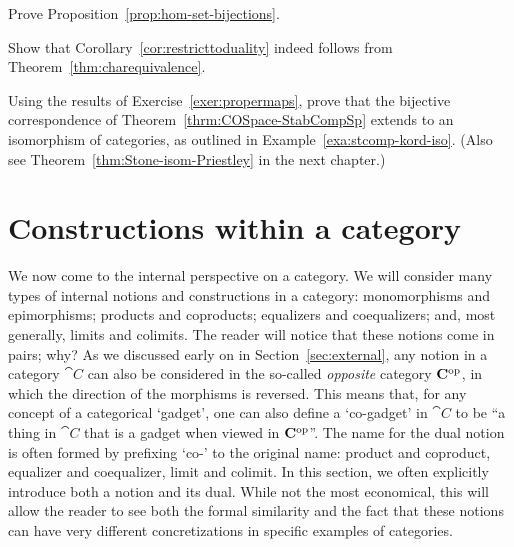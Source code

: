 \begin{exercise}\label{exe:proof-of-adjunction-equiv-def}
  Prove Proposition~\ref{prop:hom-set-bijections}.
\end{exercise}

\begin{exercise}\label{exe:proofofrestricttoduality}
Show that Corollary~\ref{cor:restricttoduality} indeed follows from Theorem~\ref{thm:charequivalence}.
\end{exercise}

\begin{exercise}\label{exe:stcomp-kord-iso}
Using the results of Exercise~\ref{exer:propermaps}, prove that the bijective correspondence of Theorem~\ref{thrm:COSpace-StabCompSp} extends to an isomorphism of categories, as outlined in Example~\ref{exa:stcomp-kord-iso}. (Also see Theorem~\ref{thm:Stone-isom-Priestley} in the next chapter.)
\end{exercise}


\section{Constructions within a category}\label{sec:internal}
We now come to the internal perspective on a category. We will consider many types of internal notions and constructions in a category: monomorphisms and epimorphisms; products and coproducts; equalizers and coequalizers; and, most generally, limits and colimits. The reader will notice that these notions come in pairs; why? As we discussed early on in Section~\ref{sec:external}, any notion in a category $\cat{C}$ can also be considered in the so-called \emph{opposite} category $\mathbf{C}^{\mathrm{op}}$, in which the direction of the morphisms is reversed. This means that, for any concept of a categorical `gadget', one can also define a `co-gadget' in $\cat{C}$ to be ``a thing in $\cat{C}$ that is a gadget when viewed in $\mathbf{C}^{\mathrm{op}}$''. The name for the dual notion is often formed by prefixing `co-' to the original name: product and coproduct, equalizer and coequalizer, limit and colimit. %
In this section, we often explicitly introduce both a notion and its dual. While not the most economical, this will allow the reader to see both the formal similarity and the fact that these notions can have very different concretizations in specific examples of categories.

